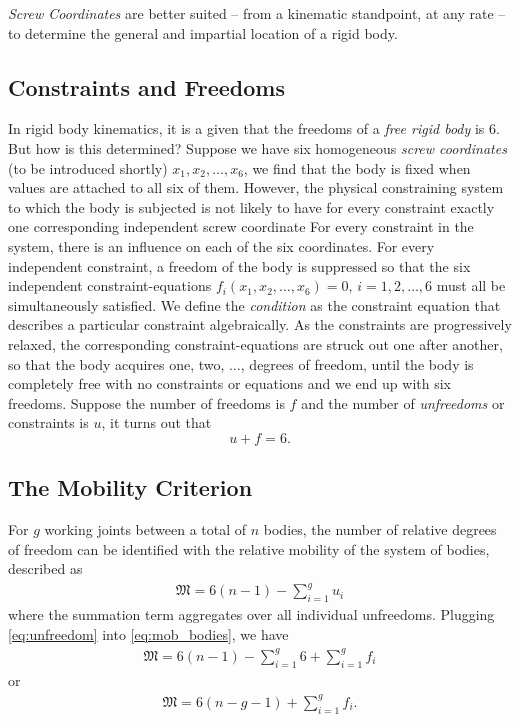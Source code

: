 \begin{tcolorbox}[title=Determining Degrees of Freedom]
	\textit{Screw Coordinates} are better suited -- from a kinematic standpoint, at any rate -- to determine the general and impartial location of a rigid body.
\end{tcolorbox}

\subsection{Constraints and Freedoms}
%
In rigid body kinematics, it is a given that the freedoms of a \textit{free rigid body} is $6$. But how is this determined? Suppose we have six homogeneous \textit{screw coordinates} (to be introduced shortly) $x_1, x_2, \ldots, x_6$, we find that the body is fixed when values are attached to all six of them. However, the physical constraining system to which the body is subjected is not likely to have for every constraint exactly one corresponding independent screw coordinate For every constraint in the system, there is an influence on each of the six coordinates. For every independent constraint, a freedom of the body is suppressed so that the six independent constraint-equations $f_i(x_1, x_2, \ldots, x_6)=0, \, i = 1, 2, \ldots, 6$ must all be simultaneously satisfied. We define the \textit{condition} as the constraint equation that describes a particular constraint algebraically. As the constraints are progressively relaxed, the corresponding constraint-equations are struck out one after another, so that the body acquires one, two, $\ldots$, degrees of freedom, until the body is completely free with no constraints or equations and we end up with six freedoms. Suppose the number of freedoms is $f$ and the number of \textit{unfreedoms} or constraints is $u$, it turns out that 
%
\begin{equation}
	u + f = 6.
	\label{eq:unfreedom}
\end{equation}

\subsection{The Mobility Criterion}

For $g$ working joints between a total of $n$ bodies, the number of relative degrees of freedom can be identified with the relative mobility of the system of bodies, described as 
%
\begin{align}
	\mathfrak{M} = 6(n-1) - \sum_{i=1}^{g} u_i
	\label{eq:mob_bodies}
\end{align}
%
where the summation term aggregates over all individual unfreedoms. Plugging \eqref{eq:unfreedom} into  \eqref{eq:mob_bodies}, we have 
%
\begin{align}
\mathfrak{M} = 6(n-1) -\sum_{i=1}^g 6 + \sum_{i=1}^{g} f_i
\end{align}
%
or 
%
\begin{align}
\mathfrak{M} = 6(n - g - 1) + \sum_{i=1}^{g} f_i.
\label{eq:mob_cond_gen}
\end{align}

